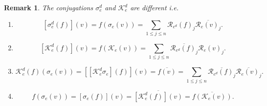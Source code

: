 \documentclass[aps,preprint]{revtex4}%
\newtheorem{remark}[theorem]{Remark}
\begin{document}
\begin{remark}
The conjugations $\mathcal{\sigma}_{e}^{d}$ and $\mathcal{K}_{e}^{d}$ are
different i.e.

\begin{enumerate}
\item
\begin{equation}
\left[  \mathcal{\sigma}_{e}^{d}\left(  f\right)  \right]  \left(  v\right)
=f\left(  \mathcal{\sigma}_{e}\left(  v\right)  \right)  =\sum_{1\leq j\leq
n}\mathcal{R}_{e^{d}}\left(  f\right)  _{j}\overline{\mathcal{R}_{e}\left(
v\right)  _{j}}.
\end{equation}


\item
\begin{equation}
\left[  \mathcal{K}_{e}^{d}\left(  f\right)  \right]  \left(  v\right)
=f\left(  \mathcal{K}_{e}\left(  v\right)  \right)  =\sum_{1\leq j\leq
n}\overline{\mathcal{R}_{e^{d}}\left(  f\right)  _{j}}\mathcal{R}_{e}\left(
v\right)  _{j}.
\end{equation}


\item
\begin{equation}
\mathcal{K}_{e}^{d}\left(  f\right)  \left(  \mathcal{\sigma}_{e}\left(
v\right)  \right)  =\left[  \left[  \mathcal{K}_{e}^{d}\mathcal{\sigma}%
_{e}\right]  \left(  f\right)  \right]  \left(  v\right)  =\overline{f\left(
v\right)  }=\sum_{1\leq j\leq n}\overline{\mathcal{R}_{e^{d}}\left(  f\right)
_{j}}\overline{\mathcal{R}_{e}\left(  v\right)  _{j}}.
\end{equation}


\item
\begin{equation}
f\left(  \mathcal{\sigma}_{e}\left(  v\right)  \right)  =\left[
\mathcal{\sigma}_{e}\left(  f\right)  \right]  \left(  v\right)
=\overline{\left[  \mathcal{K}_{e}^{d}\left(  f\right)  \right]  \left(
v\right)  }=\overline{f\left(  \mathcal{K}_{e}\left(  v\right)  \right)  }.
\end{equation}

\end{enumerate}
\end{remark}
\end{document}
